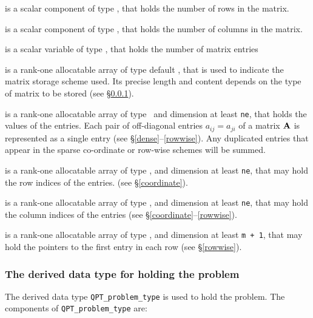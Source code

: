 \documentclass{galahad}
\begin{document}
\begin{description}

 is a scalar component of type \integer, 
that holds the number of rows in the matrix. 
 
 is a scalar component of type \integer, 
that holds the number of columns in the matrix. 
 
 is a scalar variable of type \integer, that
holds the number of matrix entries

 is a rank-one allocatable array of type default \character, that
is used to indicate the matrix storage scheme used. Its precise length and
content depends on the type of matrix to be stored (see \S\ref{typeprob}).

 is a rank-one allocatable array of type \realdp\, 
and dimension at least {\tt ne}, that holds the values of the entries. 
Each pair of off-diagonal entries $a_{ij} = a_{ji}$ of a matrix ${\mathbf{A}}$ 
is represented as a single entry 
(see \S\ref{dense}--\ref{rowwise}).
Any duplicated entries that appear in the sparse 
co-ordinate or row-wise schemes will be summed. 

 is a rank-one allocatable array of type \integer, 
and dimension at least {\tt ne}, that may hold the row indices of the entries. 
(see \S\ref{coordinate}).

 is a rank-one allocatable array of type \integer, 
and dimension at least {\tt ne}, that may hold the column indices of the entries
(see \S\ref{coordinate}--\ref{rowwise}).

 is a rank-one allocatable array of type \integer, 
and dimension at least {\tt m + 1}, that may hold the pointers to
the first entry in each row (see \S\ref{rowwise}).

\end{description}


\subsubsection{The derived data type for holding the problem}\label{typeprob}
The derived data type {\tt QPT\_problem\_type} is used to hold 
the problem. The components of 
{\tt QPT\_problem\_type} 
are:
\end{document}
